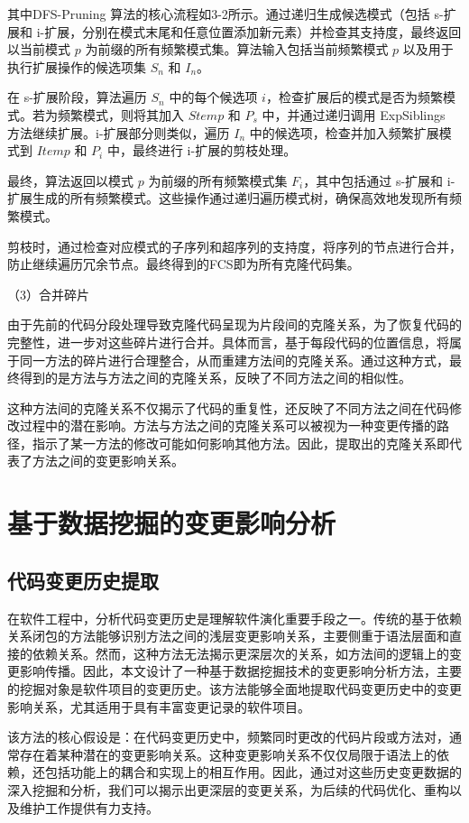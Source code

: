 其中DFS-Pruning 算法的核心流程如3-2所示。通过递归生成候选模式（包括 s-扩展和 i-扩展，分别在模式末尾和任意位置添加新元素）并检查其支持度，最终返回以当前模式 $p$ 为前缀的所有频繁模式集。算法输入包括当前频繁模式 $p$ 以及用于执行扩展操作的候选项集 $S_n$ 和 $I_n$。

在 s-扩展阶段，算法遍历 $S_n$ 中的每个候选项 $i$，检查扩展后的模式是否为频繁模式。若为频繁模式，则将其加入 $Stemp$ 和 $P_s$ 中，并通过递归调用 ExpSiblings 方法继续扩展。i-扩展部分则类似，遍历 $I_n$ 中的候选项，检查并加入频繁扩展模式到 $Itemp$ 和 $P_i$ 中，最终进行 i-扩展的剪枝处理。

最终，算法返回以模式 $p$ 为前缀的所有频繁模式集 $F_i$，其中包括通过 s-扩展和 i-扩展生成的所有频繁模式。这些操作通过递归遍历模式树，确保高效地发现所有频繁模式。


剪枝时，通过检查对应模式的子序列和超序列的支持度，将序列的节点进行合并，防止继续遍历冗余节点。最终得到的FCS即为所有克隆代码集。

（3）合并碎片

由于先前的代码分段处理导致克隆代码呈现为片段间的克隆关系，为了恢复代码的完整性，进一步对这些碎片进行合并。具体而言，基于每段代码的位置信息，将属于同一方法的碎片进行合理整合，从而重建方法间的克隆关系。通过这种方式，最终得到的是方法与方法之间的克隆关系，反映了不同方法之间的相似性。

这种方法间的克隆关系不仅揭示了代码的重复性，还反映了不同方法之间在代码修改过程中的潜在影响。方法与方法之间的克隆关系可以被视为一种变更传播的路径，指示了某一方法的修改可能如何影响其他方法。因此，提取出的克隆关系即代表了方法之间的变更影响关系。

\section{基于数据挖掘的变更影响分析}
\subsection{代码变更历史提取}

在软件工程中，分析代码变更历史是理解软件演化重要手段之一。传统的基于依赖关系闭包的方法能够识别方法之间的浅层变更影响关系，主要侧重于语法层面和直接的依赖关系。然而，这种方法无法揭示更深层次的关系，如方法间的逻辑上的变更影响传播。因此，本文设计了一种基于数据挖掘技术的变更影响分析方法，主要的挖掘对象是软件项目的变更历史。该方法能够全面地提取代码变更历史中的变更影响关系，尤其适用于具有丰富变更记录的软件项目。

该方法的核心假设是：在代码变更历史中，频繁同时更改的代码片段或方法对，通常存在着某种潜在的变更影响关系。这种变更影响关系不仅仅局限于语法上的依赖，还包括功能上的耦合和实现上的相互作用。因此，通过对这些历史变更数据的深入挖掘和分析，我们可以揭示出更深层的变更关系，为后续的代码优化、重构以及维护工作提供有力支持。

